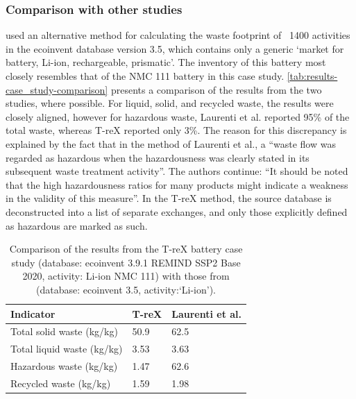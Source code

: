 \subsubsection{Comparison with other studies}\label{sec:results-case_study-comparison}

\cite{laurenti2023wastefootprint} used an alternative method for calculating the waste footprint of ~1400 activities in the ecoinvent database version 3.5, which contains only a generic `market for battery, Li-ion, rechargeable, prismatic'. The inventory of this battery most closely resembles that of the NMC 111 battery in this case study. \autoref{tab:results-case_study-comparison} presents a comparison of the results from the two studies, where possible. For liquid, solid, and recycled waste, the results were closely aligned, however for hazardous waste, Laurenti et al. reported 95\% of the total waste, whereas T-reX reported only 3\%. The reason for this discrepancy is explained by the fact that in the method of Laurenti et al., a ``waste flow was regarded as hazardous when the hazardousness
was clearly stated in its subsequent waste treatment activity''. The authors continue: ``It should be noted that the high hazardousness ratios for many products might indicate a weakness in the validity of this measure''. In the T-reX method, the source database is deconstructed into a list of separate exchanges, and only those explicitly defined as hazardous are marked as such.

\begin{table}[H]
\centering
\caption{Comparison of the results from the T-reX battery case study (database: ecoinvent 3.9.1 REMIND SSP2 Base 2020, activity: Li-ion NMC 111) with those from \cite{laurenti2023wastefootprint} (database: ecoinvent 3.5, activity:`Li-ion').}
\label{tab:results-case_study-comparison}
\begin{tabular}{lll}
\toprule
\textbf{Indicator} & \textbf{T-reX} & \textbf{Laurenti et al.} \\
\midrule
Total solid waste (kg/kg)& 50.9 & 62.5 \\
Total liquid waste (kg/kg) & 3.53 & 3.63 \\
Hazardous waste (kg/kg) & 1.47 & 62.6 \\
Recycled waste (kg/kg) & 1.59 & 1.98 \\
\bottomrule
\end{tabular}
\end{table}

